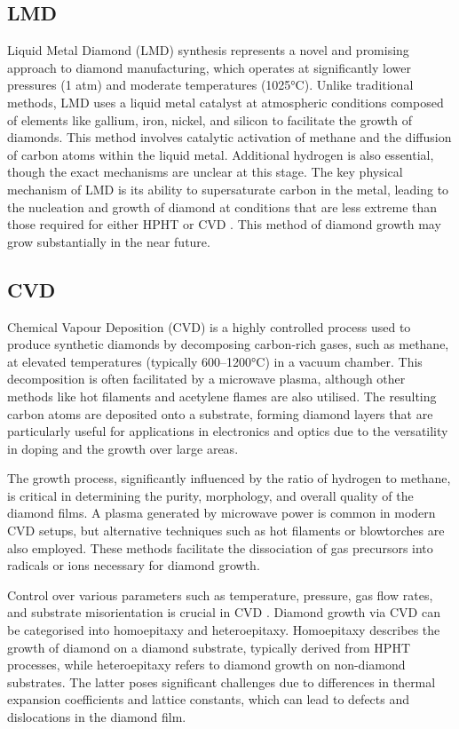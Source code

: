 \begin{refsection}
\subsection{LMD}
Liquid Metal Diamond (LMD) synthesis represents a novel and promising approach to diamond manufacturing, which operates at significantly lower pressures (1 atm) and moderate temperatures (1025\si{\degreeCelsius}). Unlike traditional methods, LMD uses a liquid metal catalyst at atmospheric conditions composed of elements like gallium, iron, nickel, and silicon to facilitate the growth of diamonds. This method involves catalytic activation of methane and the diffusion of carbon atoms within the liquid metal. Additional hydrogen is also essential, though the exact mechanisms are unclear at this stage. The key physical mechanism of LMD is its ability to supersaturate carbon in the metal, leading to the nucleation and growth of diamond at conditions that are less extreme than those required for either HPHT or CVD \cite{Gong2024}. This method of diamond growth may grow substantially in the near future.

\subsection{CVD}
Chemical Vapour Deposition (CVD) is a highly controlled process used to produce synthetic diamonds by decomposing carbon-rich gases, such as methane, at elevated temperatures (typically 600--1200\si{\degreeCelsius}) in a vacuum chamber. This decomposition is often facilitated by a microwave plasma, although other methods like hot filaments \cite{Kromka2013} and acetylene flames \cite{Garcia1998} are also utilised. The resulting carbon atoms are deposited onto a substrate, forming diamond layers that are particularly useful for applications in electronics and optics due to the versatility in doping and the growth over large areas.

The growth process, significantly influenced by the ratio of hydrogen to methane, is critical in determining the purity, morphology, and overall quality of the diamond films. A plasma generated by microwave power is common in modern CVD setups, but alternative techniques such as hot filaments or blowtorches are also employed. These methods facilitate the dissociation of gas precursors into radicals or ions necessary for diamond growth.

Control over various parameters such as temperature, pressure, gas flow rates, and substrate misorientation is crucial in CVD \cite{Lobaev2019}. Diamond growth via CVD can be categorised into homoepitaxy and heteroepitaxy. Homoepitaxy describes the growth of diamond on a diamond substrate, typically derived from HPHT processes, while heteroepitaxy refers to diamond growth on non-diamond substrates. The latter poses significant challenges due to differences in thermal expansion coefficients and lattice constants, which can lead to defects and dislocations in the diamond film.


\end{refsection}
